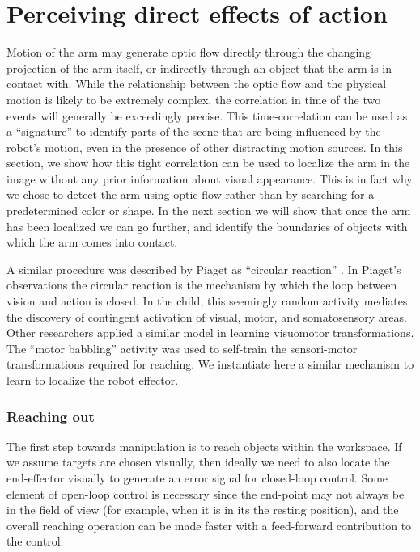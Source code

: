 
\section{Perceiving direct effects of action}
\label{sec:directeffect}

Motion of the arm may generate optic flow directly through the
changing projection of the arm itself, or indirectly through an object
that the arm is in contact with.  While the relationship between the
optic flow and the physical motion is likely to be extremely complex,
the correlation in time of the two events will generally be
exceedingly precise.  This time-correlation can be used as a
``signature'' to identify parts of the scene that are being influenced
by the robot's motion, even in the presence of other distracting
motion sources.  In this section, we show how this tight correlation
can be used to localize the arm in the image without any prior
information about visual appearance.  
\ifrev
%
This is in fact why we chose to detect the arm
using optic flow rather than by
searching for a predetermined color or shape.
%
\fi
In the next section we will show
that once the arm has been localized we can go further, and identify
the boundaries of objects with which the arm comes into contact.

\ifrev
A similar procedure was described by Piaget as ``circular reaction'' \cite{piaget63}.
In Piaget's observations the circular reaction is the mechanism by which the loop 
between vision and action is closed. In the child, this seemingly random activity 
mediates the discovery of contingent activation of visual, motor, and somatosensory areas.
Other researchers \cite{bullock-grossberg-guenther-1993} applied a similar model 
in learning visuomotor transformations. The ``motor babbling'' activity was 
used to self-train the sensori-motor transformations required for reaching. 
We instantiate here a similar mechanism to learn to localize the robot effector. 
\fi

\subsubsection*{Reaching out}

The first step towards manipulation is to reach objects within the
workspace.  If we assume targets are chosen visually, then ideally we
need to also locate the end-effector visually to generate an error
signal for closed-loop control.  Some element of open-loop control is
necessary since the end-point may not always be in the field of view
(for example, when it is in its the resting position), and the overall
reaching operation can be made faster with a feed-forward contribution
to the control.

